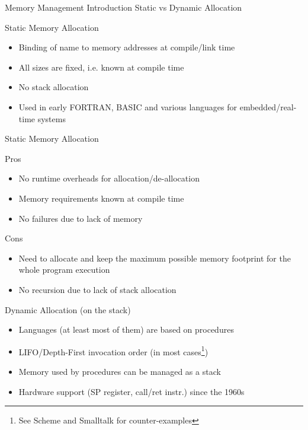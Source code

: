 \documentclass[
14pt,
aspectratio=169,
usenames,
dvipsnames,
x11names]{beamer}
\newcommand{\tik}[0]{{\color{YellowGreen}\Checkmark}} %
\newcommand{\ex}[0]{{\color{BrickRed}\XSolidBrush}}  %
\begin{document}
\begin{frame}{Memory Management Introduction}
  \centering
  Static vs Dynamic Allocation
\end{frame}

\begin{frame}{Static Memory Allocation}

  \begin{itemize}  \setlength{\itemsep}{\fill}
  \item Binding of name to memory addresses at \alert{compile/link} time
  \item All sizes are fixed, i.e. \alert{known at compile time}
  \item \alert{No stack} allocation
  \item Used in early FORTRAN, BASIC and various languages for \alert{embedded/real-time systems}
  \end{itemize}

\end{frame}

\begin{frame}{Static Memory Allocation}

  Pros \tik
  \begin{itemize}  \setlength{\itemsep}{\fill}
  \item \alert{No runtime overheads} for allocation/de-allocation
  \item Memory requirements \alert{known at compile time}
  \item \alert{No failures} due to lack of memory
  \end{itemize}

  \pause

  Cons \ex
  \begin{itemize}  \setlength{\itemsep}{\fill}
  \item Need to allocate and keep \alert{the maximum possible memory footprint} for the whole program execution
  \item \alert{No recursion} due to lack of stack allocation
  \end{itemize}

\end{frame}

\begin{frame}{Dynamic Allocation (on the stack)}
  \begin{itemize}  \setlength{\itemsep}{\fill}
  \item Languages (at least most of them) are \alert{based on procedures}
  \item \alert{LIFO/Depth-First} invocation order (in most cases\footnote{See Scheme and Smalltalk for counter-examples})
  \item Memory used by procedures can be \alert{managed as a stack}
  \item \alert{Hardware support} (SP register, call/ret instr.) since the 1960s
  \end{itemize}
\end{frame}
\end{document}
